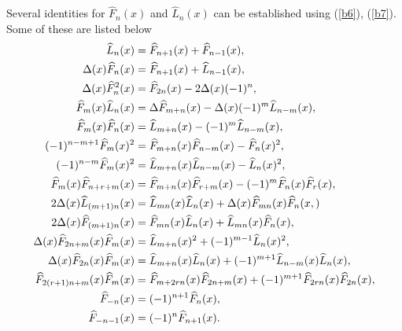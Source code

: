 \noindent Several identities for $\widehat{F}_{n}(x) $ and $\widehat{L}_{n}(x) $ can be established using (\ref{b6}), (\ref{b7}). Some of these are listed below
\begin{align*}
\widehat{L}_{n}(x)&=\widehat{F}_{n+1}(x) +\widehat{F}_{n-1}(x),  \\\bigskip
\Delta(x) \widehat{F}_{n}(x)&=\widehat{F}_{n+1}(x) +\widehat{L}_{n-1}(x),  \\ \bigskip
\Delta(x) \widehat{F}^2_{n}(x)&=\widehat{F}_{2n}(x) -2\Delta(x)(-1)^n , \\\bigskip
\widehat{F}_{m}(x)\widehat{L}_{n}(x)&=\Delta\widehat {F}_{m+n}(x)-\Delta(x)(-1)^{m}\widehat{L}_{n-m}(x), \\\bigskip
\widehat{F}_{m}(x)\widehat{F}_{n}(x)&=\widehat{L}_{m+n}(x)-(-1)^{m}\widehat{L}_{n-m}(x), \\\bigskip
(-1)^{n-m+1}\widehat{F}_{m}(x)^2&=\widehat{F}_{m+n}(x)\widehat{F}_{n-m}(x)-\widehat{F}_{n}(x)^{2},   \\\bigskip
(-1)^{n-m}\widehat{F}_{m}(x)^2&=\widehat{L}_{m+n}(x)\widehat{L}_{n-m}(x)-\widehat{L}_{n}(x)^{2},  \\\bigskip
\widehat{F}_{m}(x)\widehat{F}_{n+r+m}(x)&=\widehat{F}_{m+n}(x)\widehat{F}_{r+m}(x)-(-1)^{m}\widehat{F}_{n}(x)\widehat{F}_{r}(x),  \\\bigskip
2\Delta(x) \widehat{L}_{(m+1)n}(x)&=\widehat{L}_{mn}(x)\widehat{L}_{n}(x)+\Delta(x) \widehat{F}_{mn}(x)\widehat{F}_{n}(x,)\\\bigskip
2\Delta(x) \widehat{F}_{(m+1)n}(x)&=\widehat{F}_{mn}(x)\widehat{L}_{n}(x)+\widehat{L}_{mn}(x)\widehat{F}_{n}(x),\\\bigskip
\Delta(x) \widehat{F}_{2n+m}(x)\widehat{F}_{m}(x)&=\widehat{L}_{m+n}(x)^2+(-1)^{m-1}\widehat{L}_{n}(x)^2, \\\bigskip
\Delta(x) \widehat{F}_{2n}(x)\widehat{F}_{m}(x)&=\widehat{L}_{m+n}(x)\widehat{L}_{n}(x)+(-1)^{m+1}\widehat{L}_{n-m}(x)\widehat{L}_{n}(x),  \\\bigskip
\widehat{F}_{2(r+1)n+m}(x)\widehat{F}_{m}(x)&=\widehat{F}_{m+2rn}(x)\widehat{F}_{2n+m}(x)+(-1)^{m+1}\widehat{F}_{2rn}(x)\widehat{F}_{2n}(x), \\\bigskip
\widehat{F}_{-n}(x)&=(-1)^{n+1}\widehat{F}_{n}(x),\\\bigskip
\widehat{F}_{-n-1}(x)&=(-1)^{n}\widehat{F}_{n+1}(x).
\end{align*}
